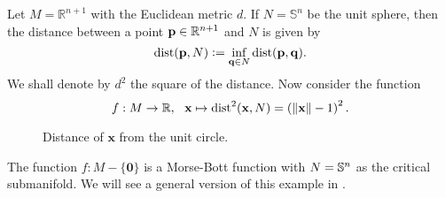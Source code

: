\begin{eg} \label{eg:MorseBottDistanceSquaredFromSphere}
    Let $M=\mathbb{R}^{n+1}$ with the Euclidean metric $d$. If $N=\mathbb{S}^n$ be the unit sphere, then the distance between a point $\mathbf{p}\in \mathbb{R}^{n+1}$ and $N$ is given by
    \begin{displaymath}
        \operatorname{dist}(\mathbf{p},N) \vcentcolon= \inf_{\mathbf{q}\in N} \operatorname{dist}(\mathbf{p},\mathbf{q}).
    \end{displaymath} 
    We shall denote by $d^2$ the square of the distance. Now consider the function
\begin{displaymath}
    f:M\to \mathbb{R},~~\mathbf{x}\mapsto \operatorname{dist}^2(\mathbf{x},N)= \left(\|\mathbf{x}\|-1\right)^2.
\end{displaymath}
\begin{figure}[H]
    \centering
    \begin{subfigure}{.5\textwidth}
      \centering
    \end{subfigure}%
    \begin{subfigure}{.5\textwidth}
      \centering
    \end{subfigure}
    \caption{Distance of $\mathbf{x}$ from the unit circle.}
        \label{fig:MorseBottDistanceSquaredFromSphere}
\end{figure}
\noindent The function $f:M-\{\mathbf{0}\}$ is a Morse-Bott function with $N=\mathbb{S}^n$ as the critical submanifold. We will see a general version of this example in .
\end{eg}

